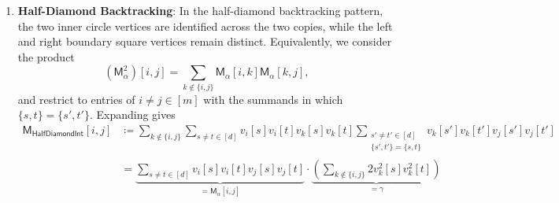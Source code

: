 \documentclass[12pt]{article}
\def \al {\alpha}
\newcommand{\gam}{\gamma}
\newcommand{\cm}{\mathsf{M} }
\begin{document}
\begin{enumerate}
	 Notice this is a scalar with mean \[ 
	 d(d-1) \cdot 2(m-1) \cdot \frac{1}{d^4} = 2m/d^2 = \gam 
	 \]
	  where we use that each Gaussian random variable has variance $\frac{1}{d}$ in our setup. This allows us to show that up to $o_d(1)$ error terms, we have \(
	  \cm_{\mathsf{DiamondInt}} = \gam \cdot  I_m \,.
	  \)
\item \textbf{Half-Diamond Backtracking}: 
In the half-diamond backtracking pattern, the two inner circle vertices are
identified across the two copies, while the left and right boundary square
vertices remain distinct. Equivalently, we consider the product
\[
    (\cm_\alpha^2)[i,j]
    =
    \sum_{k\notin\{i,j\}} \cm_\alpha[i,k]\cm_\alpha[k,j],
\]
and restrict to entries of $i\neq j\in[m]$ with the summands in which
\(
    \{s,t\}=\{s',t'\}.
\)
Expanding gives
\[
\begin{aligned}
\cm_{\mathsf{HalfDiamondInt}}[i,j]
&\coloneqq
\sum_{k\notin\{i,j\}}
\sum_{s\neq t\in[d]}
v_i[s]v_i[t]v_k[s]v_k[t]
\sum_{\substack{s'\neq t'\in[d]\\ \{s',t'\}=\{s,t\}}}
v_k[s']v_k[t']v_j[s']v_j[t']
\\
&=
		 \underbrace{ \sum_{s\neq t\in[d]} v_i[s]v_i[t] v_j[s]v_j[t] }_{=\cm_\al[i,j]}  \cdot  \underbrace{(\sum_{k\notin \{i,j\}} 2 v_k^2[s]v_k^2[t])}_{=  \gam} \end{aligned}
\]
%


\end{enumerate}
\end{document}
